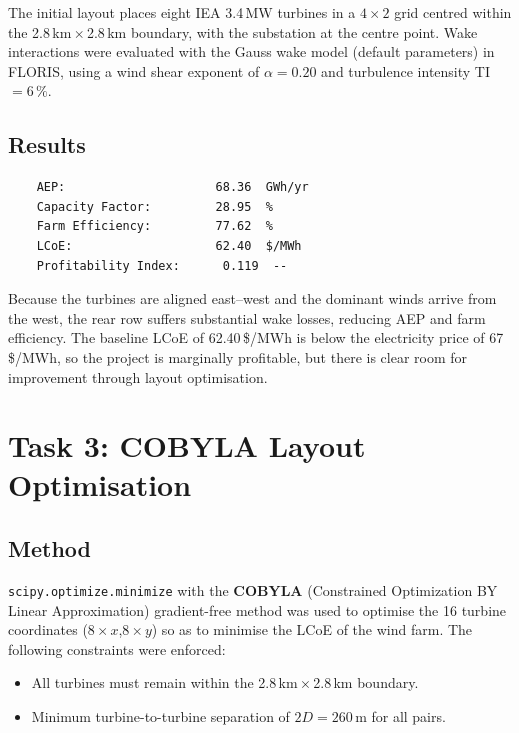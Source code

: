 \documentclass[11pt,a4paper]{article}
\begin{document}
	The initial layout places eight IEA 3.4\,MW turbines in a $4\times 2$ grid
	centred within the 2.8\,km\,$\times$\,2.8\,km boundary, with the substation at
	the centre point.  Wake interactions were evaluated with the Gauss wake model
	(default parameters) in FLORIS, using a wind shear exponent of $\alpha = 0.20$
	and turbulence intensity TI\,$= 6\,\%$.

	\subsection{Results}

	\begin{lstlisting}
	AEP:                     68.36  GWh/yr
	Capacity Factor:         28.95  %
	Farm Efficiency:         77.62  %
	LCoE:                    62.40  $/MWh
	Profitability Index:      0.119  --
	\end{lstlisting}

	Because the turbines are aligned east--west and the dominant winds arrive from
	the west, the rear row suffers substantial wake losses, reducing AEP and farm
	efficiency.  The baseline LCoE of 62.40\,\$/MWh is below the electricity price
	of 67\,\$/MWh, so the project is marginally profitable, but there is clear room
	for improvement through layout optimisation.

	\section{Task 3: COBYLA Layout Optimisation}

	\subsection{Method}

	\texttt{scipy.optimize.minimize} with the \textbf{COBYLA} (Constrained
	Optimization BY Linear Approximation) gradient-free method was used to optimise
	the 16 turbine coordinates ($8\times x$,\;$8\times y$) so as to minimise the
	LCoE of the wind farm.  The following constraints were enforced:

	\begin{itemize}[leftmargin=1.5em]
		\item All turbines must remain within the 2.8\,km\,$\times$\,2.8\,km boundary.
		\item Minimum turbine-to-turbine separation of $2D = 260$\,m for all pairs.
	\end{itemize}
\end{document}
